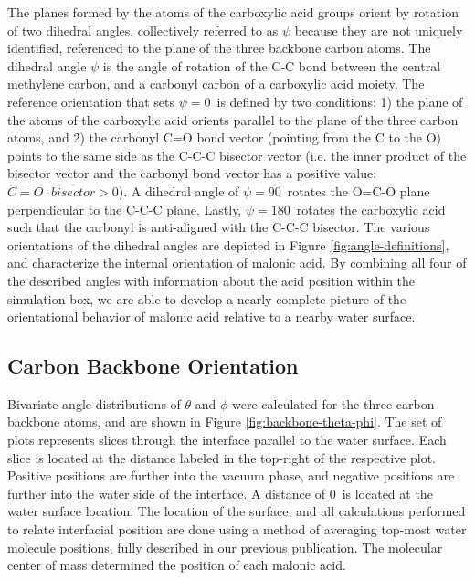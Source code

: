 The planes formed by the atoms of the carboxylic acid groups orient by rotation of two dihedral angles, collectively referred to as $\psi$ because they are not uniquely identified, referenced to the plane of the three backbone carbon atoms. The dihedral angle $\psi$ is the angle of rotation of the C-C bond between the central methylene carbon, and a carbonyl carbon of a carboxylic acid moiety. The reference orientation that sets $\psi=0$\textdegree~is defined by two conditions: 1) the plane of the atoms of the carboxylic acid orients parallel to the plane of the three carbon atoms, and 2) the carbonyl C=O bond vector (pointing from the C to the O) points to the same side as the C-C-C bisector vector (i.e. the inner product of the bisector vector and the carbonyl bond vector has a positive value: $\overline{C=O} \cdot \overline{bisector} > 0$). A dihedral angle of $\psi=90$\textdegree~rotates the O=C-O plane perpendicular to the C-C-C plane. Lastly, $\psi=180$\textdegree~rotates the carboxylic acid such that the carbonyl is anti-aligned with the C-C-C bisector. The various orientations of the dihedral angles are depicted in Figure \ref{fig:angle-definitions}, and characterize the internal orientation of malonic acid. By combining all four of the described angles with information about the acid position within the simulation box, we are able to develop a nearly complete picture of the orientational behavior of malonic acid relative to a nearby water surface.


\subsection {Carbon Backbone Orientation}

Bivariate angle distributions of $\theta$ and $\phi$ were calculated for the three carbon backbone atoms, and are shown in Figure \ref{fig:backbone-theta-phi}. The set of plots represents slices through the interface parallel to the water surface. Each slice is located at the distance labeled in the top-right of the respective plot. Positive positions are further into the vacuum phase, and negative positions are further into the water side of the interface. A distance of 0\angs~is located at the water surface location. The location of the surface, and all calculations performed to relate interfacial position are done using a method of averaging top-most water molecule positions, fully described in our previous publication.\cite{Shamay2011} The molecular center of mass determined the position of each malonic acid.

